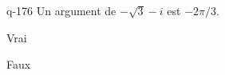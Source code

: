 \begin{truefalse}{q-176}
Un argument de $-\sqrt 3-i$ est $-2\pi/3$.
\item Vrai
\item* Faux
\end{truefalse}

